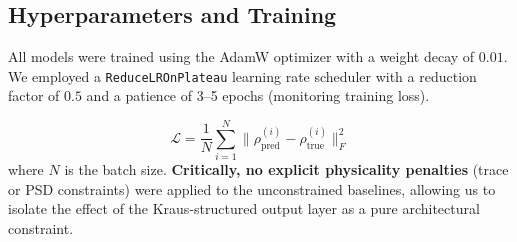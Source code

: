 \documentclass{article} %
\begin{document}
\subsection{Hyperparameters and Training}

All models were trained using the AdamW optimizer \citep{loshchilov2019adamw} with a weight decay of $0.01$. We employed a \texttt{ReduceLROnPlateau} learning rate scheduler with a reduction factor of $0.5$ and a patience of 3--5 epochs (monitoring training loss).

\begin{equation}
\mathcal{L} = \frac{1}{N} \sum_{i=1}^{N} \| \rho_{\text{pred}}^{(i)} - \rho_{\text{true}}^{(i)} \|_F^2
\end{equation}
where $N$ is the batch size. \textbf{Critically, no explicit physicality penalties} (trace or PSD constraints) were applied to the unconstrained baselines, allowing us to isolate the effect of the Kraus-structured output layer as a pure architectural constraint.
\end{document}
